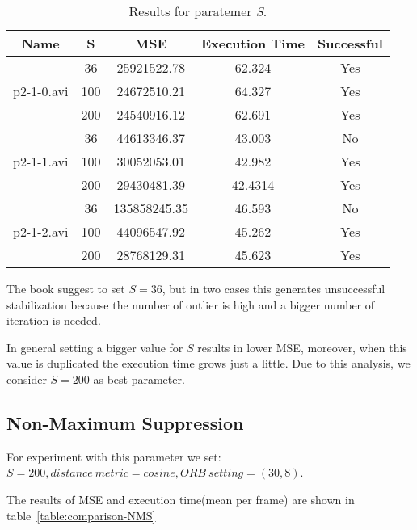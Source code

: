 \begin{table}[H]
\centering
\begin{tabular}{|c|c|c|c|c|}
\hline
\textbf{Name} & \textbf{S} & \textbf{MSE} & \textbf{Execution Time} & \textbf{Successful} \\ \hline
\multirow{3}{*}{p2-1-0.avi} & 36 & 25921522.78 & 62.324 & Yes \\ \cline{2-5} 
 & 100 & 24672510.21 & 64.327 & Yes \\ \cline{2-5} 
 & 200 & 24540916.12 & 62.691 & Yes \\ \hline
\multirow{3}{*}{p2-1-1.avi} & 36 & 44613346.37 & 43.003 & No \\ \cline{2-5} 
 & 100 & 30052053.01 & 42.982 & Yes \\ \cline{2-5} 
 & 200 & 29430481.39 & 42.4314 & Yes \\ \hline
\multirow{3}{*}{p2-1-2.avi} & 36 & 135858245.35 & 46.593 & No \\ \cline{2-5} 
 & 100 & 44096547.92 & 45.262 & Yes \\ \cline{2-5} 
 & 200 & 28768129.31 & 45.623 & Yes \\ \hline
\end{tabular}
\caption{Results for paratemer \textit{S}.}
\label{table:comparison-S}
\end{table}

The book suggest to set $S=36$, but in two cases this generates unsuccessful stabilization because the number of outlier is high and a bigger number of iteration is needed.

In general setting a bigger value for $S$ results in lower MSE, moreover, when this value is duplicated the execution time grows just a little. Due to this analysis, we consider $S=200$ as best parameter.

\subsection{Non-Maximum Suppression}

For experiment with this parameter we set: $S=200, distance~metric=cosine, ORB~ setting = (30,8)$.

The results of MSE and execution time(mean per frame) are shown in table~\ref{table:comparison-NMS}

